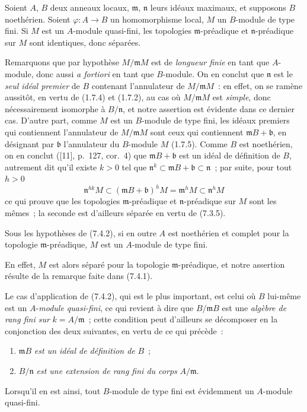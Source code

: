 \begin{proposition}[7.4.2]
\label{0.7.4.2-fr}
Soient $A$, $B$ deux anneaux locaux, $\mathfrak m$, $\mathfrak n$ leurs idéaux
maximaux, et supposons $B$ noethérien. Soient $\varphi:A\to B$ un
homomorphisme local, $M$ un $B$-module de type fini. Si $M$ est un $A$-module
quasi-fini, les topologies $\mathfrak m$-préadique et $\mathfrak n$-préadique
sur $M$ sont identiques, donc séparées.
\end{proposition}

Remarquons que par hypothèse $M/\mathfrak mM$ est de \emph{longueur finie} en
tant que $A$-module, donc aussi \emph{a fortiori} en tant que $B$-module. On en
conclut que $\mathfrak n$ est le \emph{seul idéal premier} de $B$ contenant
l'annulateur de $M/\mathfrak mM$~: en effet, on se ramène aussitôt, en vertu
de (1.7.4) et (1.7.2), au cas où $M/\mathfrak mM$ est \emph{simple}, donc
nécessairement isomorphe à $B/\mathfrak n$, et notre assertion est évidente
dans ce dernier cas. D'autre part, comme $M$ est un $B$-module de type fini,
les idéaux premiers qui contiennent l'annulateur de $M/\mathfrak mM$ sont ceux
qui contiennent $\mathfrak mB+\mathfrak b$, en désignant par $\mathfrak b$
l'annulateur du $B$-module $M$ (1.7.5). Comme $B$ est noethérien, on en conclut
([11], p.~127, cor.~4) que $\mathfrak mB+\mathfrak b$ est un idéal
de définition de $B$, autrement dit qu'il existe $k>0$ tel que
$\mathfrak n^k\subset\mathfrak mB+\mathfrak b\subset\mathfrak n$~; par suite,
pour tout $h>0$
\[
  \mathfrak n^{hk}M
  \subset(\mathfrak mB+\mathfrak b)^hM
  =\mathfrak m^hM
  \subset\mathfrak n^hM
\]
ce qui prouve que les topologies $\mathfrak m$-préadique et
$\mathfrak n$-préadique sur $M$ sont les mêmes~; la seconde est d'ailleurs
séparée en vertu de (7.3.5).

\begin{corollary}[7.4.3]
\label{0.7.4.3-fr}
Sous les hypothèses de \textup{(7.4.2)}, si en outre $A$ est noethérien et complet pour
la topologie $\mathfrak m$-préadique, $M$ est un $A$-module de type fini.
\end{corollary}

En effet, $M$ est alors séparé pour la topologie $\mathfrak m$-préadique, et
notre assertion résulte de la remarque faite dans (7.4.1).

\begin{env}[7.4.4]
\label{0.7.4.4-fr}
Le cas d'application de (7.4.2), qui est le plus important, est celui où $B$
lui-même est un $A$-\emph{module quasi-fini}, ce qui revient à dire que
$B/\mathfrak mB$ est une \emph{algèbre de rang fini sur}
$k=A/\mathfrak m$~; cette condition peut d'ailleurs se décomposer en la
conjonction des deux suivantes, en vertu de ce qui précède~:
\begin{enumerate}
  \item[(i)] $\mathfrak mB$ \emph{est un idéal de définition de} $B$~;
  \item[(ii)] $B/\mathfrak n$ \emph{est une extension de rang fini du corps}
  $A/\mathfrak m$.
\end{enumerate}

Lorsqu'il en est ainsi, tout $B$-module de type fini est évidemment un
$A$-module quasi-fini.
\end{env}

